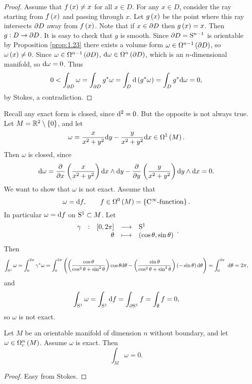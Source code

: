 \begin{proof}
Assume that $ f\br{x} \ne x $ for all $ x \in D $. For any $ x \in D $, consider the ray starting from $ f\br{x} $ and passing through $ x $. Let $ g\br{x} $ be the point where this ray intersects $ \da D $ away from $ f\br{x} $. Note that if $ x \in \da D $ then $ g\br{x} = x $. Then $ g : D \to \da D $. It is easy to check that $ g $ is smooth. Since $ \da D = \S^{n - 1} $ is orientable by Proposition \ref{prop:1.23} there exists a volume form $ \omega \in \Omega^{n - 1}\br{\da D} $, so $ \omega\br{x} \ne 0 $. Since $ \omega \in \Omega^{n - 1}\br{\da D} $, $ \d\omega \in \Omega^n\br{\da D} $, which is an $ n $-dimensional manifold, so $ \d\omega = 0 $. Thus
$$ 0 < \int_{\da D} \omega = \int_{\da D} g^*\omega = \int_D \d\br{g^*\omega} = \int_D g^*\d\omega = 0, $$
by Stokes, a contradiction.
\end{proof}

\begin{example}
Recall any exact form is closed, since $ \d^2 = 0 $. But the opposite is not always true. Let $ M = \RR^2 \setminus \cbr{0} $, and let
$$ \omega = \dfrac{x}{x^2 + y^2}\d y - \dfrac{y}{x^2 + y^2}\d x \in \Omega^1\br{M}. $$
Then $ \omega $ is closed, since
$$ \d\omega = \dpd{}{x}\br{\dfrac{x}{x^2 + y^2}}\d x \wedge \d y - \dpd{}{y}\br{\dfrac{y}{x^2 + y^2}}\d y \wedge \d x = 0. $$
We want to show that $ \omega $ is not exact. Assume that
$$ \omega = \d f, \qquad f \in \Omega^0\br{M} = \cbr{\text{$ \C^\infty $-function}}. $$
In particular $ \omega = \d f $ on $ \S^1 \subset M $. Let
$$ \function[\gamma]{\sbr{0, 2\pi}}{\S^1}{\theta}{\br{\cos \theta, \sin \theta}}. $$
Then
$$ \int_{\S^1} \omega = \int_0^{2\pi} \gamma^*\omega = \int_0^{2\pi} \br{\br{\dfrac{\cos \theta}{\cos^2 \theta + \sin^2 \theta}}\cos \theta\d\theta - \br{\dfrac{\sin \theta}{\cos^2 \theta + \sin^2 \theta}}\br{-\sin \theta}\d\theta} = \intd{0}{2\pi}{}{\theta} = 2\pi, $$
and
$$ \int_{\S^1} \omega = \int_{\S^1} \d f = \int_{\da\S^1} f = \int_\emptyset f = 0, $$
so $ \omega $ is not exact.
\end{example}

\pagebreak

\begin{proposition}
Let $ M $ be an orientable manifold of dimension $ n $ without boundary, and let $ \omega \in \Omega_\c^n\br{M} $. Assume $ \omega $ is exact. Then
$$ \int_M \omega = 0. $$
\end{proposition}

\begin{proof}
Easy from Stokes.
\end{proof}

